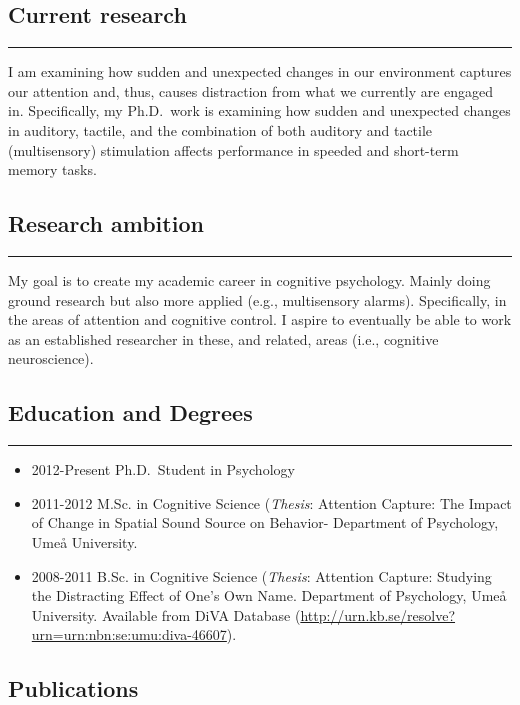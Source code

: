 \documentclass[]{article}
\begin{document}
\subsection{Current research}\label{current-research}

\hrule

I am examining how sudden and unexpected changes in our environment
captures our attention and, thus, causes distraction from what we
currently are engaged in. Specifically, my Ph.D.~work is examining how
sudden and unexpected changes in auditory, tactile, and the combination
of both auditory and tactile (multisensory) stimulation affects
performance in speeded and short-term memory tasks.

\subsection{Research ambition}\label{research-ambition}

\hrule

My goal is to create my academic career in cognitive psychology. Mainly
doing ground research but also more applied (e.g., multisensory alarms).
Specifically, in the areas of attention and cognitive control. I aspire
to eventually be able to work as an established researcher in these, and
related, areas (i.e., cognitive neuroscience).

\subsection{Education and Degrees}\label{education-and-degrees}

\hrule

\begin{itemize}
\item
  2012-Present Ph.D.~Student in Psychology
\item
  2011-2012 M.Sc. in Cognitive Science (\emph{Thesis}: Attention
  Capture: The Impact of Change in Spatial Sound Source on Behavior-
  Department of Psychology, Umeå University.
\item
  2008-2011 B.Sc. in Cognitive Science (\emph{Thesis}: Attention
  Capture: Studying the Distracting Effect of One's Own Name. Department
  of Psychology, Umeå University. Available from DiVA Database
  (\url{http://urn.kb.se/resolve?urn=urn:nbn:se:umu:diva-46607}).
\end{itemize}

\subsection{Publications}\label{publications}
\end{document}
